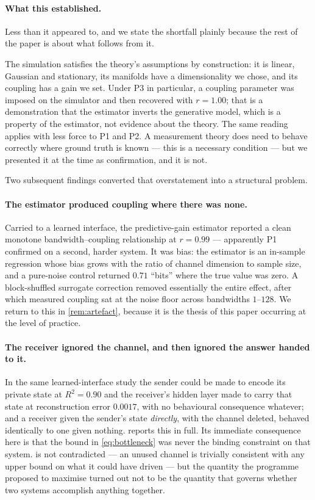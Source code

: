 \documentclass[11pt,a4paper]{article}
\theoremstyle{plain}
\theoremstyle{definition}
\theoremstyle{remark}
\begin{document}
\paragraph{What this established.}
Less than it appeared to, and we state the shortfall plainly because the rest of the paper is
about what follows from it.

The simulation satisfies the theory's assumptions by construction: it is linear, Gaussian and
stationary, its manifolds have a dimensionality we chose, and its coupling has a gain we set.
Under P3 in particular, a coupling parameter was imposed on the simulator and then recovered
with $r = 1.00$; that is a demonstration that the estimator inverts the generative model, which
is a property of the estimator, not evidence about the theory. The same reading applies with
less force to P1 and P2. A measurement theory does need to behave correctly where ground truth
is known --- this is a necessary condition --- but we presented it at the time as
confirmation, and it is not.

Two subsequent findings converted that overstatement into a structural problem.

\paragraph{The estimator produced coupling where there was none.}
Carried to a learned interface, the predictive-gain estimator reported a clean monotone
bandwidth--coupling relationship at $r = 0.99$ --- apparently P1 confirmed on a second, harder
system. It was bias: the estimator is an in-sample regression whose bias grows with the ratio of
channel dimension to sample size, and a pure-noise control returned $0.71$ ``bits'' where the
true value was zero. A block-shuffled surrogate correction removed essentially the entire
effect, after which measured coupling sat at the noise floor across bandwidths $1$--$128$. We
return to this in \cref{rem:artefact}, because it is the thesis of this paper occurring at the
level of practice.

\paragraph{The receiver ignored the channel, and then ignored the answer handed to it.}
In the same learned-interface study the sender could be made to encode its private state at
$R^2 = 0.90$ and the receiver's hidden layer made to carry that state at reconstruction error
$0.0017$, with no behavioural consequence whatever; and a receiver given the sender's state
\emph{directly}, with the channel deleted, behaved identically to one given nothing.
 reports this in full. Its immediate consequence here is that the bound in
\eqref{eq:bottleneck} was never the binding constraint on that system. 
is not contradicted --- an unused channel is trivially consistent with any upper bound on what
it could have driven --- but the quantity the programme proposed to maximise turned out not to
be the quantity that governs whether two systems accomplish anything together.
\end{document}
